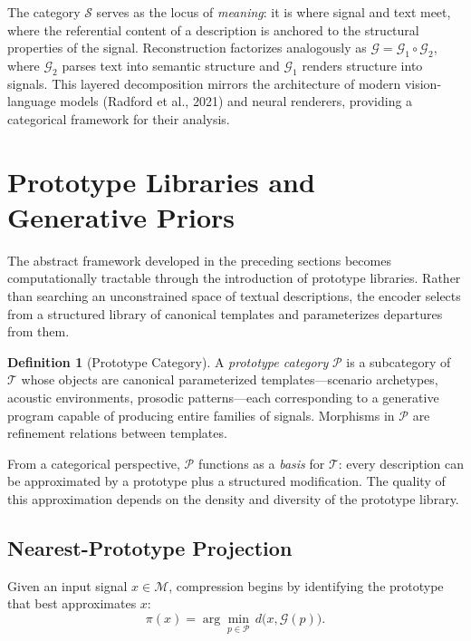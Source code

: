 \documentclass[11pt,a4paper]{article}
\theoremstyle{definition}
\newtheorem{definition}[theorem]{Definition}
\theoremstyle{remark}
\begin{document}
The category $\mathcal{S}$ serves as the locus of \emph{meaning}: it is where signal and text meet, where the referential content of a description is anchored to the structural properties of the signal. Reconstruction factorizes analogously as $\mathcal{G} = \mathcal{G}_1 \circ \mathcal{G}_2$, where $\mathcal{G}_2$ parses text into semantic structure and $\mathcal{G}_1$ renders structure into signals. This layered decomposition mirrors the architecture of modern vision-language models (Radford et al., 2021) and neural renderers, providing a categorical framework for their analysis.

\section{Prototype Libraries and Generative Priors}
\label{sec:prototypes}

The abstract framework developed in the preceding sections becomes computationally tractable through the introduction of prototype libraries. Rather than searching an unconstrained space of textual descriptions, the encoder selects from a structured library of canonical templates and parameterizes departures from them.

\begin{definition}[Prototype Category]
A \emph{prototype category} $\mathcal{P}$ is a subcategory of $\mathcal{T}$ whose objects are canonical parameterized templates---scenario archetypes, acoustic environments, prosodic patterns---each corresponding to a generative program capable of producing entire families of signals. Morphisms in $\mathcal{P}$ are refinement relations between templates.
\end{definition}

From a categorical perspective, $\mathcal{P}$ functions as a \emph{basis} for $\mathcal{T}$: every description can be approximated by a prototype plus a structured modification. The quality of this approximation depends on the density and diversity of the prototype library.

\subsection{Nearest-Prototype Projection}

Given an input signal $x \in \mathcal{M}$, compression begins by identifying the prototype that best approximates $x$:
\begin{equation}
\pi(x) = \arg\min_{p \in \mathcal{P}} \, d\big(x, \mathcal{G}(p)\big).
\label{eq:projection}
\end{equation}
\end{document}
